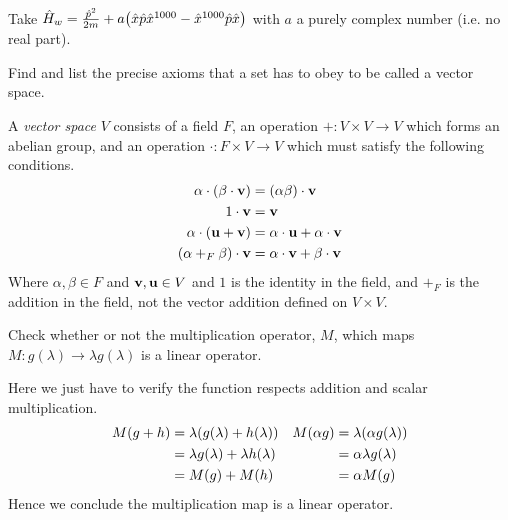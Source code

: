 \documentclass[boxes,pages]{homework}
\makeatletter
\numberwithin{@problem}{section}
\makeatother
\begin{document}
\begin{solution}
	Take $\hat{H}_w = \frac{\hat{p}^2}{2m} + a\qty(\hat{x}\hat{p}\hat{x}^{1000} - \hat{x}^{1000}\hat{p}\hat{x})$ with $a$ a purely complex number (i.e. no real part).
\end{solution}

\begin{problem}
Find and list the precise axioms that a set has to obey to be called a vector space.
\end{problem}

\begin{solution}
	A \emph{vector space} $V$ consists of a field $F$, an operation $+:V\times V\to V$ which forms an abelian group, and an operation $\cdot:F\times V\to V$ which must satisfy the following conditions.
	\begin{align*}
		\alpha\cdot(\beta\cdot\vb{v}) & = (\alpha\beta)\cdot\vb{v}              \\
		1\cdot\vb{v}                  & = \vb{v}                                \\
		\alpha\cdot(\vb{u} + \vb{v})  & = \alpha\cdot\vb{u} + \alpha\cdot\vb{v} \\
		(\alpha +_F \beta)\cdot\vb{v} & = \alpha\cdot\vb{v} + \beta\cdot\vb{v}
	\end{align*}
	Where $\alpha,\beta\in F$ and $\vb{v}, \vb{u}\in V$ and $1$ is the identity in the field, and $+_F$ is the addition in the field, not the vector addition defined on $V\times V$.
\end{solution}

\begin{problem}
Check whether or not the multiplication operator, $M$, which maps $M: g(\lambda)\to\lambda g(\lambda)$ is a linear operator.
\end{problem}

\begin{solution}
	Here we just have to verify the function respects addition and scalar multiplication.
	\begin{align*}
		M(g + h) & = \lambda\qty(g(\lambda) + h(\lambda))    & M(\alpha g) & = \lambda(\alpha g(\lambda)) \\
		         & = \lambda g(\lambda) + \lambda h(\lambda) &             & = \alpha\lambda g(\lambda)   \\
		         & = M(g) + M(h)                             &             & = \alpha M(g)                \\
	\end{align*}
	Hence we conclude the multiplication map is a linear operator.
\end{solution}
\end{document}
